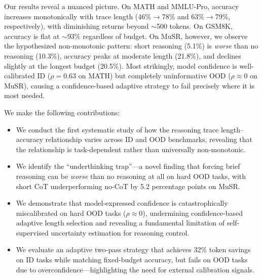 Our results reveal a nuanced picture. On MATH and MMLU-Pro, accuracy increases monotonically with trace length (46\%$\rightarrow$78\% and 63\%$\rightarrow$79\%, respectively), with diminishing returns beyond ${\sim}$500 tokens. On GSM8K, accuracy is flat at ${\sim}$93\% regardless of budget. On MuSR, however, we observe the hypothesized non-monotonic pattern: short reasoning (5.1\%) is \emph{worse} than no reasoning (10.3\%), accuracy peaks at moderate length (21.8\%), and declines slightly at the longest budget (20.5\%). Most strikingly, model confidence is well-calibrated ID ($\rho{=}0.63$ on MATH) but completely uninformative OOD ($\rho{\approx}0$ on MuSR), causing a confidence-based adaptive strategy to fail precisely where it is most needed.

We make the following contributions:
\begin{itemize}[leftmargin=*,itemsep=0pt,topsep=0pt]
    \item We conduct the first systematic study of how the reasoning trace length--accuracy relationship varies across ID and OOD benchmarks, revealing that the relationship is task-dependent rather than universally non-monotonic.
    \item We identify the ``underthinking trap''---a novel finding that forcing brief reasoning can be \emph{worse} than no reasoning at all on hard OOD tasks, with short CoT underperforming no-CoT by 5.2 percentage points on MuSR.
    \item We demonstrate that model-expressed confidence is catastrophically miscalibrated on hard OOD tasks ($\rho{\approx}0$), undermining confidence-based adaptive length selection and revealing a fundamental limitation of self-supervised uncertainty estimation for reasoning control.
    \item We evaluate an adaptive two-pass strategy that achieves 32\% token savings on ID tasks while matching fixed-budget accuracy, but fails on OOD tasks due to overconfidence---highlighting the need for external calibration signals.
\end{itemize}
